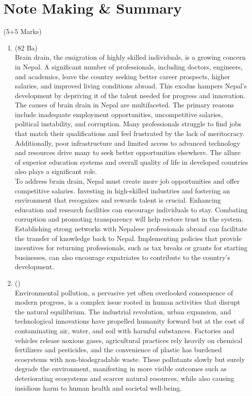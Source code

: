 \documentclass[12pt]{article}
\begin{document}
\pagebreak

\section{Note Making \& Summary}
  \begin{center}(5+5 Marks)\end{center}

  \begin{enumerate}
    \item (82 Ba)\\
      Brain drain, the emigration of highly skilled individuals, is a growing concern in Nepal. A significant number of professionals, including doctors, engineers, and academics, leave the country seeking better career prospects, higher salaries, and improved living conditions abroad. This exodus hampers Nepal's development by depriving it of the talent needed for progress and innovation. The causes of brain drain in Nepal are multifaceted. The primary reasons include inadequate employment opportunities, uncompetitive salaries, political instability, and corruption. Many professionals struggle to find jobs that match their qualifications and feel frustrated by the lack of meritocracy. Additionally, poor infrastructure and limited access to advanced technology and resources drive many to seek better opportunities elsewhere. The allure of superior education systems and overall quality of life in developed countries also plays a significant role.\\

      To address brain drain, Nepal must create more job opportunities and offer competitive salaries. Investing in high-skilled industries and fostering an environment that recognizes and rewards talent is crucial. Enhancing education and research facilities can encourage individuals to stay. Combating corruption and promoting transparency will help restore trust in the system. Establishing strong networks with Nepalese professionals abroad can facilitate the transfer of knowledge back to Nepal. Implementing policies that provide incentives for returning professionals, such as tax breaks or grants for starting businesses, can also encourage expatriates to contribute to the country's development.

    \item ()\\
      Environmental pollution, a pervasive yet often overlooked consequence of modern progress, is a complex issue rooted in human activities that disrupt the natural equilibrium. The industrial revolution, urban expansion, and technological innovations have propelled humanity forward but at the cost of contaminating air, water, and soil with harmful substances. Factories and vehicles release noxious gases, agricultural practices rely heavily on chemical fertilizers and pesticides, and the convenience of plastic has burdened ecosystems with non-biodegradable waste. These pollutants slowly but surely degrade the environment, manifesting in more visible outcomes such as deteriorating ecosystems and scarcer natural resources, while also causing insidious harm to human health and societal well-being.\\


\end{enumerate}
\end{document}
